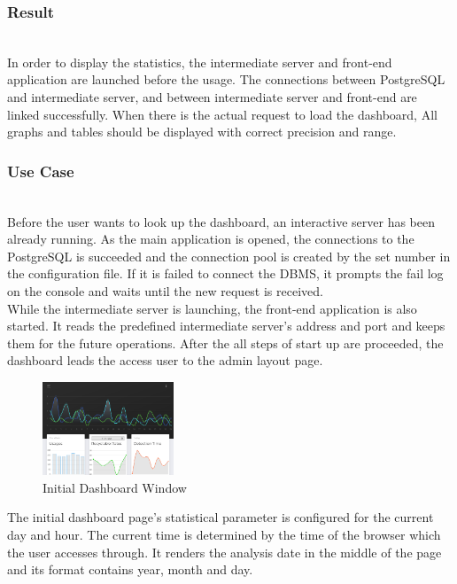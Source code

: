 \documentclass[conference]{IEEEtran}
\begin{document}
\subsubsection{Result}~\\
In order to display the statistics, the intermediate server and front-end application are launched before the usage. The connections between PostgreSQL and intermediate server, and between intermediate server and front-end are linked successfully. When there is the actual request to load the dashboard, All graphs and tables should be displayed with correct precision and range.~\\

\subsubsection{Use Case}~\\
Before the user wants to look up the dashboard, an interactive server has been already running. As the main application is opened, the connections to the PostgreSQL is succeeded and the connection pool is created by the set number in the configuration file. If it is failed to connect the DBMS, it prompts the fail log on the console and waits until the new request is received.\\

While the intermediate server is launching, the front-end application is also started. It reads the predefined intermediate server's address and port and keeps them for the future operations. After the all steps of start up are proceeded, the dashboard leads the access user to the admin layout page.\\

\begin{figure}[h]
    \centering
    \includegraphics[width=0.35\textwidth]{images/dashboard_init_page.eps}
    \caption{Initial Dashboard Window}
\end{figure}

The initial dashboard page's statistical parameter is configured for the current day and hour. The current time is determined by the time of the browser which the user accesses through. It renders the analysis date in the middle of the page and its format contains year, month and day.\\
\end{document}
